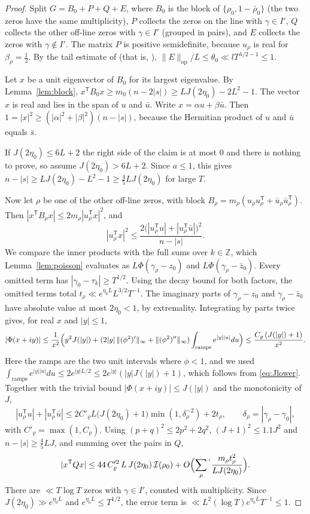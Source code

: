 \documentclass[reqno,11pt]{amsart}
\numberwithin{equation}{section}
\theoremstyle{plain}
\theoremstyle{remark}
\begin{document}
\begin{proof}
Split $G=B_0+P+Q+E$, where $B_0$ is the block of $\{\rho_0,1-\bar\rho_0\}$ (the
two zeros have the same multiplicity), $P$ collects the zeros on the line with
$\gamma\in I'$, $Q$ collects the other off-line zeros with $\gamma\in I'$
(grouped in pairs), and $E$ collects the zeros with $\gamma\notin I'$. The matrix
$P$ is positive semidefinite, because $u_\rho$ is real for $\beta_\rho=\frac12$.
By the tail estimate of \cite[\S2.2]{YY26a} (that is, \cite[Prop.~4.2]{C26}),
$\|E\|_{\mathrm{op}}/L\le\theta_0\ll lT^{\lambda/2-1}\le1$.

Let $x$ be a unit eigenvector of $B_0$ for its largest eigenvalue. By
Lemma~\ref{lem:block}, $x^{\mathsf T}B_0x\ge m_0(n-2|s|)\ge LJ(2\eta_0)-2L^2-1$.
The vector $x$ is real and lies in the span of $u$ and $\bar u$. Write
$x=\alpha u+\beta\bar u$. Then
$1=|x|^2\ge(|\alpha|^2+|\beta|^2)(n-|s|)$, because the Hermitian product of $u$
and $\bar u$ equals $\bar s$.

If $J(2\eta_0)\le6L+2$ the right side of the claim is at most $0$ and
there is nothing to prove, so assume $J(2\eta_0)>6L+2$. Since $a\le1$, this
gives $n-|s|\ge LJ(2\eta_0)-L^2-1\ge\frac45LJ(2\eta_0)$ for large $T$.

Now let $\rho$ be one of the other off-line zeros, with block
$B_\rho=m_\rho(u_\rho u_\rho^{\mathsf T}+\bar u_\rho\bar u_\rho^{\mathsf T})$. Then
$|x^{\mathsf T}B_\rho x|\le2m_\rho|u_\rho^{\mathsf T}x|^2$, and
\[
|u_\rho^{\mathsf T}x|^2\le\frac{2\bigl(|u_\rho^{\mathsf T}u|+|u_\rho^{\mathsf T}\bar u|\bigr)^2}{n-|s|}.
\]
We compare the inner products with the full sums over $k\in\mathbb Z$, which
Lemma~\ref{lem:poisson} evaluates as $L\Phi(\gamma_\rho-z_0)$ and
$L\Phi(\gamma_\rho-\bar z_0)$. Every omitted term has
$|\gamma_0-\tau_k|\ge T^{1/2}$. Using the decay bound for both factors, the
omitted terms total $t_\rho\ll e^{\eta_0L}L^{3/2}T^{-1}$. The imaginary parts
of $\gamma_\rho-z_0$ and $\gamma_\rho-\bar z_0$ have absolute value at most
$2\eta_0<1$, by extremality. Integrating by parts twice gives, for real $x$ and
$|y|\le1$,
\[
|\Phi(x+iy)|\le\frac1{x^2}\Bigl(y^2J(|y|)+(2|y|\,\|(\phi^2)'\|_\infty+\|(\phi^2)''\|_\infty)\int_{\text{ramps}}e^{|y||u|}du\Bigr)
\le\frac{C_\varrho\,(J(|y|)+1)}{x^2}.
\]
Here the ramps are the two unit intervals where $\phi<1$, and we used
$\int_{\text{ramps}}e^{|y||u|}du\le2e^{|y|L/2}\le2e^{|y|}(|y|J(|y|)+1)$, which
follows from \eqref{eq:Jlower}. Together with the trivial bound
$|\Phi(x+iy)|\le J(|y|)$ and the monotonicity of $J$,
\[
|u_\rho^{\mathsf T}u|+|u_\rho^{\mathsf T}\bar u|\le
2C'_\varrho L\bigl(J(2\eta_0)+1\bigr)\min(1,\delta_\rho^{-2})+2t_\rho,\qquad
\delta_\rho=|\gamma_\rho-\gamma_0|,
\]
with $C'_\varrho=\max(1,C_\varrho)$. Using $(p+q)^2\le2p^2+2q^2$,
$(J+1)^2\le1.1J^2$ and $n-|s|\ge\frac45LJ$, and summing over the pairs in $Q$,
\[
|x^{\mathsf T}Qx|\le 44\,C_\varrho'^2\,L\,J(2\eta_0)\,\mathcal I(\rho_0)
+O\Bigl(\sum_{\rho}{}^{'}\frac{m_\rho t_\rho^2}{LJ(2\eta_0)}\Bigr).
\]
There are $\ll T\log T$ zeros with $\gamma\in I'$, counted with
multiplicity. Since $J(2\eta_0)\gg e^{\eta_0L}$ and $e^{\eta_0L}\le T^{1/2}$,
the error term is $\ll L^2(\log T)e^{\eta_0 L}T^{-1}\le1$.


\end{proof}
\end{document}
